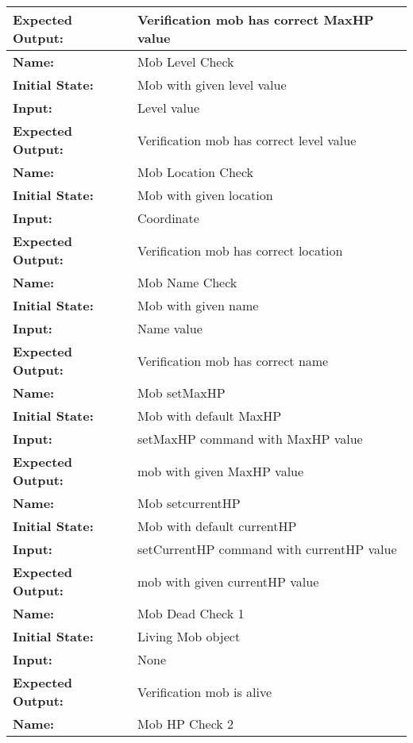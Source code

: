 \documentclass[12pt, titlepage]{article}
\begin{document}
\begin{center}
\begin{longtable}{ l | p{10cm} }
				\textbf{Expected Output:} & Verification mob has correct MaxHP value\\[0.6em]
				\hline
				\rule{0pt}{1.5em}\textbf{Name:} & Mob Level Check\\
				\textbf{Initial State:} & Mob with given level value\\
				\textbf{Input:} & Level value\\
				\textbf{Expected Output:} & Verification mob has correct level value\\[0.6em]
				\hline
				\rule{0pt}{1.5em}\textbf{Name:} & Mob Location Check\\
				\textbf{Initial State:} & Mob with given location\\
				\textbf{Input:} & Coordinate\\
				\textbf{Expected Output:} & Verification mob has correct location\\[0.6em]
				\hline
				\rule{0pt}{1.5em}\textbf{Name:} & Mob Name Check\\
				\textbf{Initial State:} & Mob with given name\\
				\textbf{Input:} & Name value\\
				\textbf{Expected Output:} & Verification mob has correct name\\[0.6em]
				\hline
				\rule{0pt}{1.5em}\textbf{Name:} & Mob setMaxHP\\
				\textbf{Initial State:} & Mob with default MaxHP\\
				\textbf{Input:} & setMaxHP command with MaxHP value\\
				\textbf{Expected Output:} & mob with given MaxHP value\\[0.6em]
				\hline
				\rule{0pt}{1.5em}\textbf{Name:} & Mob setcurrentHP\\
				\textbf{Initial State:} & Mob with default currentHP\\
				\textbf{Input:} & setCurrentHP command with currentHP value\\
				\textbf{Expected Output:} & mob with given currentHP value\\[0.6em]
				\hline
				\rule{0pt}{1.5em}\textbf{Name:} & Mob Dead Check 1\\
				\textbf{Initial State:} & Living Mob object\\
				\textbf{Input:} & None\\
				\textbf{Expected Output:} & Verification mob is alive\\[0.6em]
				\hline
				\rule{0pt}{1.5em}\textbf{Name:} & Mob HP Check 2\\

\end{longtable}
\end{center}
\end{document}
